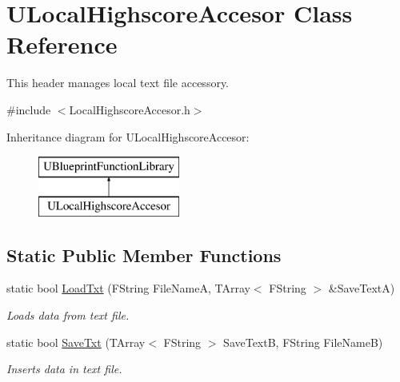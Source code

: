 \hypertarget{class_u_local_highscore_accesor}{}\section{U\+Local\+Highscore\+Accesor Class Reference}
\label{class_u_local_highscore_accesor}


This header manages local text file accessory.  




{\ttfamily \#include $<$Local\+Highscore\+Accesor.\+h$>$}

Inheritance diagram for U\+Local\+Highscore\+Accesor\+:\begin{figure}[H]
\begin{center}
\leavevmode
\includegraphics[height=2.000000cm]{class_u_local_highscore_accesor}
\end{center}
\end{figure}
\subsection*{Static Public Member Functions}
\begin{DoxyCompactItemize}
\item 
\mbox{\label{class_u_local_highscore_accesor_a0d0d5df72ec4f612cca71f2e26874138}} 
static bool \mbox{\hyperlink{class_u_local_highscore_accesor_a0d0d5df72ec4f612cca71f2e26874138}{Load\+Txt}} (F\+String File\+NameA, T\+Array$<$ F\+String $>$ \&Save\+TextA)
\begin{DoxyCompactList}\small\item\em Loads data from text file. \end{DoxyCompactList}\item 
\mbox{\label{class_u_local_highscore_accesor_a5bd958582af0dddc232e284e2df552c7}} 
static bool \mbox{\hyperlink{class_u_local_highscore_accesor_a5bd958582af0dddc232e284e2df552c7}{Save\+Txt}} (T\+Array$<$ F\+String $>$ Save\+TextB, F\+String File\+NameB)
\begin{DoxyCompactList}\small\item\em Inserts data in text file. \end{DoxyCompactList}\end{DoxyCompactItemize}


